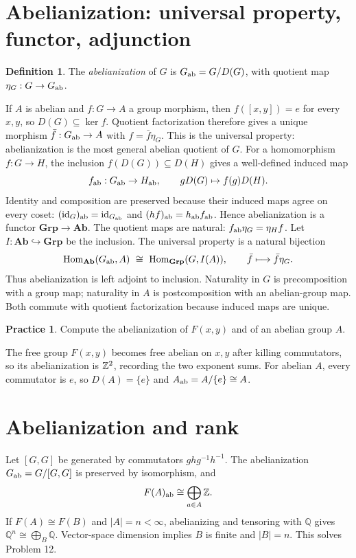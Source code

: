 \documentclass[11pt,openany]{book}
\newcommand{\Q}{\mathbb Q}\newcommand{\R}{\mathbb R}
\newcommand{\id}{\operatorname{id}}\newcommand{\Sym}{\operatorname{Sym}}
\newcommand{\Hom}{\operatorname{Hom}}\newcommand{\Aut}{\operatorname{Aut}}
\theoremstyle{definition}
\newtheorem{definition}[theorem]{Definition}
\newtheorem{exercise}[theorem]{Practice}
\begin{document}
\section{Abelianization: universal property, functor, adjunction}
\begin{definition}The \emph{abelianization} of $G$ is $G_{\rm ab}=G/D(G)$, with quotient map $\eta_G:G\to G_{\rm ab}$.\end{definition}
If $A$ is abelian and $f:G\to A$ a group morphism, then $f([x,y])=e$ for every $x,y$, so $D(G)\subseteq\ker f$. Quotient factorization therefore gives a unique morphism $\bar f:G_{\rm ab}\to A$ with $f=\bar f\eta_G$. This is the universal property: abelianization is the most general abelian quotient of $G$.
For a homomorphism $f:G\to H$, the inclusion $f(D(G))\subseteq D(H)$ gives a well-defined induced map
\[f_{\rm ab}:G_{\rm ab}\to H_{\rm ab},\qquad gD(G)\mapsto f(g)D(H).\]
Identity and composition are preserved because their induced maps agree on every coset: $(\id_G)_{\rm ab}=\id_{G_{\rm ab}}$ and $(hf)_{\rm ab}=h_{\rm ab}f_{\rm ab}$. Hence abelianization is a functor $\mathbf{Grp}\to\mathbf{Ab}$. The quotient maps are natural: $f_{\rm ab}\eta_G=\eta_Hf$.
Let $I:\mathbf{Ab}\hookrightarrow\mathbf{Grp}$ be the inclusion. The universal property is a natural bijection
\[\Hom_{\mathbf{Ab}}(G_{\rm ab},A)\ \cong\ \Hom_{\mathbf{Grp}}(G,I(A)),\qquad \bar f\longmapsto\bar f\eta_G.\]
Thus abelianization is left adjoint to inclusion. Naturality in $G$ is precomposition with a group map; naturality in $A$ is postcomposition with an abelian-group map. Both commute with quotient factorization because induced maps are unique.
\begin{exercise}Compute the abelianization of $F(x,y)$ and of an abelian group $A$.\end{exercise}
\begin{solution}The free group $F(x,y)$ becomes free abelian on $x,y$ after killing commutators, so its abelianization is $\mathbb Z^2$, recording the two exponent sums. For abelian $A$, every commutator is $e$, so $D(A)=\{e\}$ and $A_{\rm ab}=A/\{e\}\cong A$.\end{solution}
\section{Abelianization and rank}
Let $[G,G]$ be generated by commutators $ghg^{-1}h^{-1}$. The abelianization $G_{\rm ab}=G/[G,G]$ is preserved by isomorphism, and
\[
F(A)_{\rm ab}\cong\bigoplus_{a\in A}\mathbb Z.
\]
If $F(A)\cong F(B)$ and $|A|=n<\infty$, abelianizing and tensoring with $\Q$ gives
$\Q^n\cong\bigoplus_B\Q$. Vector-space dimension implies $B$ is finite and $|B|=n$. This solves Problem 12.
\end{document}
